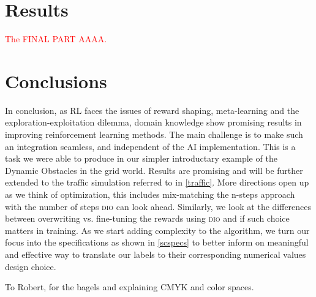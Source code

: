 \documentclass[acmsmall]{acmart}
\theoremstyle{definition}
\newcommand{\dio}{\textsc{dio}}
\begin{document}





\section{Results}
\textcolor{red}{The FINAL PART AAAA.}

 

\section{Conclusions}
In conclusion, as RL faces the issues of reward shaping, meta-learning and the exploration-exploitation dilemma, domain knowledge show promising results in 
improving reinforcement learning methods. The main challenge is to make such an integration seamless, and independent of the AI implementation. 
This is a task we were able to produce in our simpler introductary example of the Dynamic Obstacles in the grid world. Results are promising and will be further 
extended to the traffic simulation referred to in \ref{traffic}. More directions open up as we think of optimization, this includes mix-matching the n-steps approach with the 
number of steps \dio{} can look ahead. Similarly, we look at the differences between overwriting vs. fine-tuning the rewards using \dio{} and if such choice matters in training. 
As we start adding complexity to the algorithm, we turn our focus into the specifications as shown in \ref{scspecs} to better inform 
on meaningful and effective way to translate our labels to their corresponding numerical values design choice. 


\begin{acks}
To Robert, for the bagels and explaining CMYK and color spaces.
\end{acks}





\appendix
\end{document}
